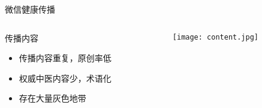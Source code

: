 \begin{frame}{微信健康传播}
\begin{columns}
    \begin{column}{0.5\textwidth}
        \begin{exampleblock}{传播内容}
            \begin{itemize}
                \item 传播内容重复，原创率低
                \item 权威中医内容少，术语化
                \item 存在大量灰色地带
            \end{itemize}
        \end{exampleblock}
    \end{column}
    \begin{column}{0.6\textwidth}
        
        \begin{figure}[h]
            \texttt{[image: content.jpg]}
        \end{figure}
        
    \end{column}
\end{columns}
\end{frame}
% 

